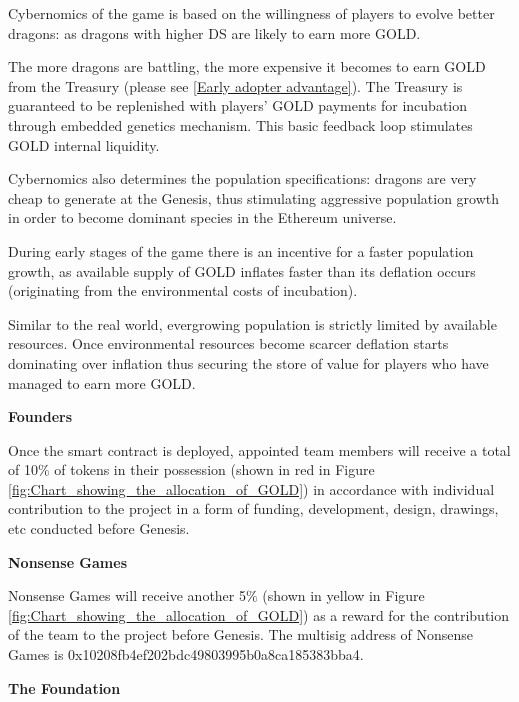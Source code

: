 \documentclass[12pt]{article}
\begin{document}
Cybernomics of the game is based on the willingness of players to evolve better dragons: as dragons with higher DS are likely to earn more GOLD.\par

The more dragons are battling, the more expensive it becomes to earn GOLD from the Treasury (please see \ref{Early adopter advantage}). The Treasury is guaranteed to be replenished with players' GOLD payments for incubation through embedded genetics mechanism. This basic feedback loop stimulates GOLD internal liquidity.\par

Cybernomics also determines the population specifications: dragons are very cheap to generate at the Genesis, thus stimulating aggressive population growth in order to become dominant species in the Ethereum universe.\par

During early stages of the game there is an incentive for a faster population growth, as available  supply of GOLD inflates faster than its deflation occurs (originating from the environmental costs of incubation).\par

Similar to the real world, evergrowing population is strictly limited by available resources. Once environmental resources become scarcer deflation starts dominating over inflation thus securing the store of value for players who have managed to earn more GOLD.\par

\textbf{Founders}\par

Once the smart contract is deployed, appointed team members will receive a total of 10$\%$ of tokens in their possession (shown in red in Figure \ref{fig:Chart_showing_the_allocation_of_GOLD}) in accordance with individual contribution to the project in a form of funding, development, design, drawings, etc conducted before Genesis.\par

\textbf{Nonsense Games}\par

Nonsense Games will receive another 5$\%$ (shown in yellow in Figure \ref{fig:Chart_showing_the_allocation_of_GOLD}) as a reward for the contribution of the team to the project before Genesis. The multisig address of Nonsense Games is 0x10208fb4ef202bdc49803995b0a8ca185383bba4.\par

\textbf{The Foundation}\par
\end{document}
